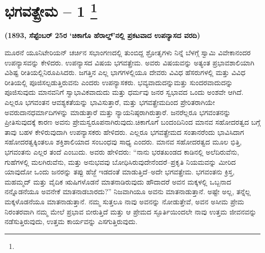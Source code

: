 
\chapter[ಭಗವತ್ಪ್ರೇಮ – ೧ ]{ಭಗವತ್ಪ್ರೇಮ – 1 \protect\footnote{}}

\centerline{\textbf{(1893, ಸೆಪ್ಟೆಂಬರ್​ 25ರ ‘ಚಿಕಾಗೊ ಹೆರಾಲ್ಡ್​’ನಲ್ಲಿ ಪ್ರಕಟವಾದ ಉಪನ್ಯಾಸದ ವರದಿ)}}

ಮೂರನೆ ಯೂನಿಟೇರಿಯನ್​ ಚರ್ಚಿನ ಸಭಾಂಗಣದಲ್ಲಿ ತುಂಬಿದ್ದ ಶ್ರೋತೃಗಳು ನಿನ್ನೆ ಬೆಳಗ್ಗೆ ಸ್ವಾಮಿ ವಿವೇಕಾನಂದರ ಉಪನ್ಯಾಸವನ್ನು ಕೇಳಿದರು. ಉಪನ್ಯಾಸದ ವಿಷಯ ಭಗವತ್ಪ್ರೇಮ. ಅವರು ವಿಷಯವನ್ನು ಅತ್ಯಂತ ಪ್ರಭಾವಶಾಲಿಯಾಗಿ ವಿಶಿಷ್ಟ ರೀತಿಯಲ್ಲಿ\break ನಿರೂಪಿಸಿದರು. ಜಗತ್ತಿನ ಎಲ್ಲ ಭಾಗಗಳಲ್ಲಿಯೂ ದೇವರು ವಿವಿಧ ಹೆಸರುಗಳಲ್ಲಿ ಮತ್ತು ವಿವಿಧ ರೀತಿಯಲ್ಲಿ ಪೂಜಿಸಲ್ಪಡುತ್ತಿರುವನು ಎಂದರು ಉಪನ್ಯಾಸಕರು. ಭವ್ಯವಾದುದನ್ನು\break ಮತ್ತು ಸುಂದರವಾದುದನ್ನು ಪೂಜಿಸುವುದು ಮಾನವನಿಗೆ ಸ್ವಾಭಾವಿಕವಾದುದು ಮತ್ತು ಧರ್ಮವು ಜನರ ಸ್ವಭಾವದ ಒಂದು ಅಂಶವೇ ಆಗಿದೆ. ಎಲ್ಲರೂ ಭಗವಂತನ ಆವಶ್ಯ\-ಕತೆಯನ್ನು ಭಾವಿಸುತ್ತಾರೆ, ಮತ್ತು ಭಗವತ್ಪ್ರೇಮದಿಂದ ಪ್ರೇರಿತರಾಗಿಯೇ ಅವರು\break ದಾನಧರ್ಮಾದಿಗಳನ್ನು ಮಾಡುತ್ತಾರೆ ಮತ್ತು ನ್ಯಾಯನಿಷ್ಠರಾಗಿರುತ್ತಾರೆ. ಜನರೆಲ್ಲರೂ ಭಗವಂತನನ್ನು ಪ್ರೀತಿಸುವುದಕ್ಕೆ ಕಾರಣ ಅವನು ಪ್ರೇಮಸ್ವರೂಪನಾಗಿರುವುದು.\break ಚಿಕಾಗೊಗೆ ಬಂದಂದಿನಿಂದ ಮಾನವ ಸಹೋದರತ್ವದ ಬಗ್ಗೆ ತಾವು ಬಹಳ ಕೇಳಿರುವುದಾಗಿ ಉಪನ್ಯಾಸಕರು ಹೇಳಿದರು. ಎಲ್ಲರೂ ಭಗವತ್ಪ್ರೇಮದ ಸಂತಾನರೆಂದು ಭಾವಿಸಿದಾಗ ಸಹೋದರತ್ವಕ್ಕಿಂತಲೂ ಶಕ್ತಿಶಾಲಿಯಾದ ಸಂಬಂಧವು ಸಾಧ್ಯ ಎಂದರು. ಮಾನವ ಸಹೋದರತ್ವದ ಮೂಲ ಭಿತ್ತಿ, ಭಗವಂತನು ಎಲ್ಲರ ತಂದೆ ಎಂಬುದು. ಅವರು ಹೇಳಿದರು: “ನಾನು ಭರತಖಂಡದ ಕಾಡಿನಲ್ಲಿ ಅಲೆದಿರುವೆನು, ಗುಹೆಗಳಲ್ಲಿ ಮಲಗಿರುವೆನು, ಮತ್ತು ಅನುಭವವು ಬೋಧಿಸಿರುವುದೇನೆಂದರೆ–ಪ್ರಕೃತಿ ನಿಯಮವನ್ನು ಮೀರಿದ ಯಾವುದೋ ಒಂದು ಜನರನ್ನು ತಪ್ಪು ಹೆಜ್ಜೆ ಇಡದಂತೆ ಮಾಡುತ್ತಿದೆ–ಅದೇ ಭಗವತ್ಪ್ರೇಮ. ಭಗವಂತನು ಕ್ರಿಸ್ತ, ಮಹಮ್ಮದ್​ ಮತ್ತು ವೈದಿಕ ಋಷಿಗಳೊಡನೆ ಮಾತನಾಡಿರುವುದು ಹೌದಾದರೆ ಅವನ ಮಕ್ಕಳಲ್ಲಿ ಒಬ್ಬನಾದ ನನ್ನೊಡನೆಯೂ ಅವನೇಕೆ ಮಾತನಾಡಬಾರದು?” ನಿಜವಾಗಿಯೂ ಅವನು ಮಾತನಾಡುತ್ತಾನೆ. ಅಷ್ಟೇ ಅಲ್ಲ, ತನ್ನೆಲ್ಲ ಮಕ್ಕಳೊಡನೆಯೂ ಮಾತನಾಡುತ್ತಾನೆ. ನಮ್ಮ ಸುತ್ತಲೂ ನಾವು ಅವನನ್ನು ನೋಡುತ್ತೇವೆ, ಅವನ ಅಸೀಮ ಪ್ರೇಮ ನಿರಂತರವಾಗಿ ನಮ್ಮ ಮೇಲೆ ಪ್ರಭಾವ ಬೀರುತ್ತಿದೆ ಮತ್ತು ಆ ಪ್ರೇಮದ ಸ್ಫೂರ್ತಿಯಿಂದಲೇ ನಾವು ಉತ್ತಮ ಜೀವನವನ್ನು ನಡೆಸುತ್ತಿರುವುದು, ಉತ್ತಮ ಕಾರ್ಯವನ್ನು ಎಸಗುತ್ತಿರುವುದು.

